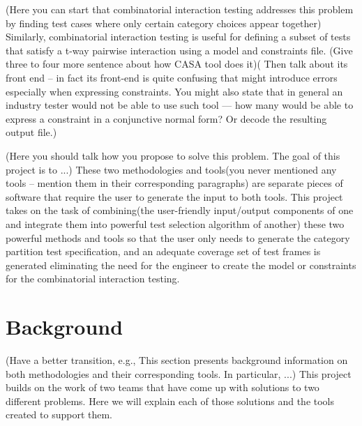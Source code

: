 \documentclass[a4full,12pt]{article}
\newcommand{\eas}[1]{{\color{blue}\sf ({#1})}}
\begin{document}
\eas{Here you can start that combinatorial interaction testing addresses this problem by finding test cases where only certain category choices appear together}
 Similarly, combinatorial interaction testing is useful for defining a subset of tests that satisfy a t-way pairwise interaction using a model and constraints file. \eas{Give three to four more sentence about how  CASA tool does it}\eas{ Then talk about its front end -- in fact its front-end is quite confusing that might introduce errors especially when expressing constraints. You might also state that in general an industry tester would not be able to use such tool --- how many would be able to express a constraint in a conjunctive normal form? Or decode the resulting output file.}
 
\eas{Here you should talk how you propose to solve this problem. The goal of this project is to ...} These two methodologies and tools\eas{you never mentioned any tools -- mention them in their corresponding paragraphs} are separate pieces of software that require the user  to generate the input to both tools. This project takes on the task of combining\eas{the user-friendly input/output components of one and integrate them into powerful test selection algorithm of another} these two powerful methods and tools so that the user only needs to generate the category partition test specification, and an adequate coverage set of test frames is generated eliminating the need for the engineer to create the model or constraints for the combinatorial interaction testing.

  
\section{Background}
\eas{Have  a better transition, e.g., This section presents background information on both methodologies and their corresponding tools. In particular, ...}
This project builds on the work of two teams that have come up with solutions to
  two different problems. Here we will explain each of those solutions and the 
  tools created to support them.
\end{document}

